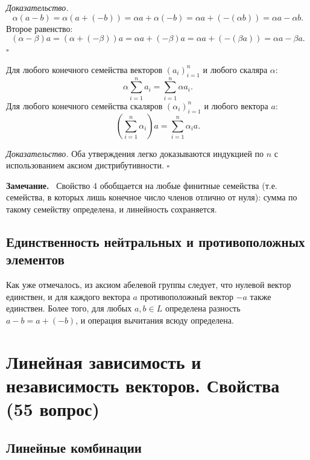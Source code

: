 \documentclass[a4paper,12pt]{article}
\newcommand{\myremark}{\textbf{Замечание.}\ }
\theoremstyle{definition}
\theoremstyle{plain}
\theoremstyle{remark}
\begin{document}
	\medskip
	\textit{Доказательство.}
	\[
	\alpha(a - b) = \alpha(a + (-b)) = \alpha a + \alpha(-b) = \alpha a + (-(\alpha b)) = \alpha a - \alpha b.
	\]
	Второе равенство:
	\[
	(\alpha - \beta)a = (\alpha + (-\beta))a = \alpha a + (-\beta)a = \alpha a + (-(\beta a)) = \alpha a - \beta a.
	\]
	\hfill \(\square\)
	
	\begin{tcolorbox}[colback=blue!5, colframe=blue!40!black, title=Свойство 4 (Линейность конечных сумм)]
		Для любого конечного семейства векторов \((a_i)_{i=1}^n\) и любого скаляра \(\alpha\):
		\[
		\alpha \sum_{i=1}^n a_i = \sum_{i=1}^n \alpha a_i.
		\]
		Для любого конечного семейства скаляров \((\alpha_i)_{i=1}^n\) и любого вектора \(a\):
		\[
		\left( \sum_{i=1}^n \alpha_i \right) a = \sum_{i=1}^n \alpha_i a.
		\]
	\end{tcolorbox}
	
	\medskip
	\textit{Доказательство.}
	Оба утверждения легко доказываются индукцией по \(n\) с использованием аксиом дистрибутивности. \hfill \(\square\)
	
	\myremark
	Свойство 4 обобщается на любые финитные семейства (т.е. семейства, в которых лишь конечное число членов отлично от нуля): сумма по такому семейству определена, и линейность сохраняется.
	
	\subsection{Единственность нейтральных и противоположных элементов}
	
	Как уже отмечалось, из аксиом абелевой группы следует, что нулевой вектор единствен, и для каждого вектора \(a\) противоположный вектор \(-a\) также единствен. Более того, для любых \(a, b \in L\) определена разность \(a - b = a + (-b)\), и операция вычитания всюду определена.
	
	
	
	
	\newpage
	\section{Линейная зависимость и независимость векторов. Свойства (55 вопрос)}
	
	\subsection{Линейные комбинации}
	
\end{document}
